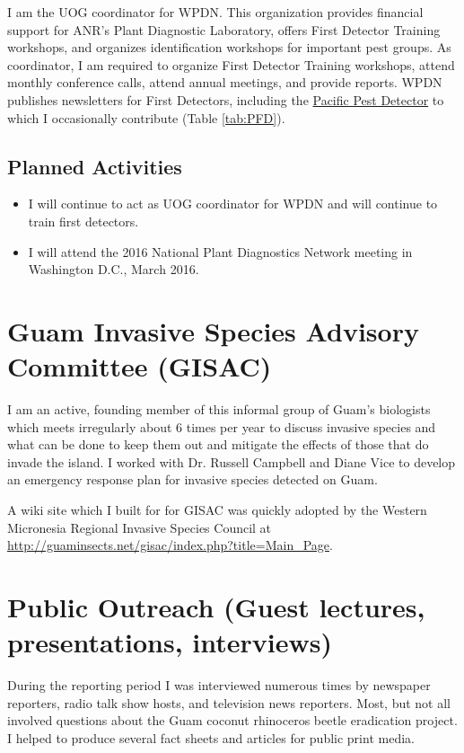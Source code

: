\documentclass[12pt,oneside,english]{scrbook}
\begin{document}
I am the UOG coordinator for WPDN. This organization provides financial
support for ANR's Plant Diagnostic Laboratory, offers First Detector
Training workshops, and organizes identification workshops for important
pest groups. As coordinator, I am required to organize First Detector
Training workshops, attend monthly conference calls, attend annual
meetings, and provide reports.
WPDN publishes newsletters for First Detectors, including the \href{https://www.wpdn.org/ppd_newsletter_archive}{Pacific Pest Detector} to which I occasionally contribute (Table \ref{tab:PFD}).

\subsection{Planned Activities}
\begin{itemize}
\item I will continue to act as UOG coordinator for WPDN and will continue to train first detectors.
\item I will attend the 2016 National Plant Diagnostics Network meeting in Washington D.C., March 2016.
\end{itemize}

\section{Guam Invasive Species Advisory Committee (GISAC)}

I am an active, founding member of this informal group of Guam's biologists
which meets irregularly about 6 times per year to discuss invasive
species and what can be done to keep them out and mitigate the effects
of those that do invade the island. I worked with Dr. Russell Campbell
and Diane Vice to develop an emergency response plan for invasive
species detected on Guam.

A wiki site which I built for for GISAC was quickly adopted by the
Western Micronesia Regional Invasive Species Council at \url{http://guaminsects.net/gisac/index.php?title=Main_Page}.

\section{Public Outreach (Guest lectures, presentations, interviews)}

During the reporting period I was interviewed numerous times by newspaper
reporters, radio talk show hosts, and television news reporters. Most, but not all involved questions about
the Guam coconut rhinoceros beetle eradication project. I helped to produce
several fact sheets and articles for public print media. 
\end{document}
